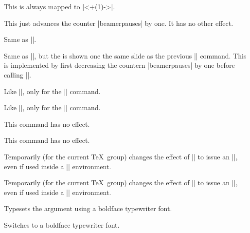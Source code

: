 \begin{command}{\bstep{}}
  This is always mapped to |\uncover<+(1)->|.
\end{command}

\begin{command}{\dstep}
  This just advances the counter |beamerpauses| by one. It has no other effect.
\end{command}

\begin{command}{\vstep}
  Same as |\dstep|.
\end{command}

\begin{command}{\restep{}}
  Same as |\step|, but the  is shown one the same slide as the previous |\step| command. This is implemented by first decreasing the countern  |beamerpauses| by one before calling |\step|.
\end{command}

\begin{command}{\reswitch{}}
  Like |\restep|, only for the |\switch| command.
\end{command}

\begin{command}{\rebstep{}}
  Like |\restep|, only for the |\bstep| command.
\end{command}

\begin{command}{\redstep}
  This command has no effect.
\end{command}

\begin{command}{\revstep}
  This command has no effect.
\end{command}

\begin{command}{\boxedsteps}
  Temporarily (for the current \TeX\ group) changes the effect of |\step| to issue an |\uncover|, even if used inside a |\stepwise| environment.
\end{command}

\begin{command}{\nonboxedsteps}
  Temporarily (for the current \TeX\ group) changes the effect of |\step| to issue an |\only|, even if used inside a |\parstepwise| environment.
\end{command}

\begin{command}{\code{}}
  Typesets the argument using a boldface typewriter font.
\end{command}

\begin{command}{\codeswitch}
  Switches to a boldface typewriter font.
\end{command}
